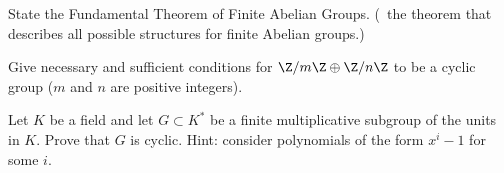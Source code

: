 \begin{alist}
\item State the Fundamental Theorem of Finite Abelian Groups. (\Ie\ 
the theorem that describes all possible structures for finite Abelian
groups.)
\item Give necessary and sufficient conditions for $\Z/m\Z\oplus
\Z/n\Z$ to be a cyclic group ($m$ and $n$ are positive integers).
\item Let $K$ be a field and let $G\subset K^*$ be a finite
multiplicative subgroup of the units in $K$. Prove that $G$ is cyclic.
Hint: consider polynomials of the form $x^i-1$ for some $i$.
\end{alist}
